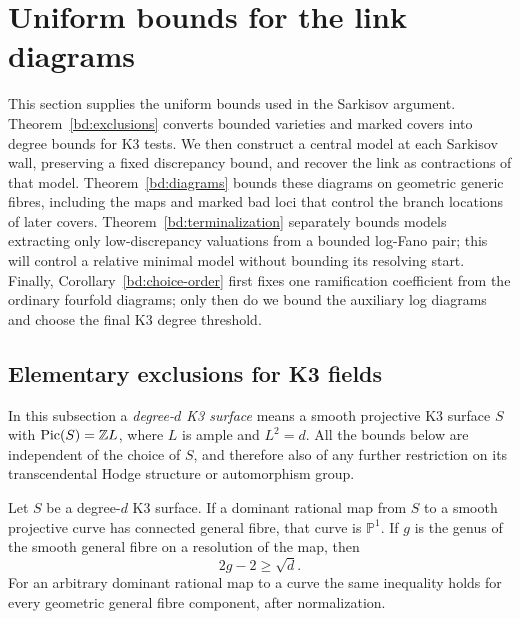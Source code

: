 \section{Uniform bounds for the link diagrams}\label{bd:section}

This section supplies the uniform bounds used in the Sarkisov argument.
Theorem~\ref{bd:exclusions} converts bounded varieties and marked covers
into degree bounds for K3 tests. We then construct a central model at
each Sarkisov wall, preserving a fixed discrepancy bound, and recover
the link as contractions of that model. Theorem~\ref{bd:diagrams}
bounds these diagrams on geometric generic fibres, including the maps
and marked bad loci that control the branch locations of later covers.
Theorem~\ref{bd:terminalization} separately bounds models extracting
only low-discrepancy valuations from a bounded log-Fano pair; this will
control a relative minimal model without bounding its resolving start.
Finally, Corollary~\ref{bd:choice-order} first fixes
one ramification coefficient from the ordinary fourfold diagrams;
only then do we bound the auxiliary log diagrams and choose the final
K3 degree threshold.

\subsection{Elementary exclusions for K3 fields}

In this subsection a \emph{degree-$d$ K3 surface} means a smooth projective
K3 surface $S$ with $\operatorname{Pic}(S)=\mathbb Z L$, where $L$ is ample and
$L^2=d$.  All the bounds below are independent of the choice of $S$, and
therefore also of any further restriction on its transcendental Hodge
structure or automorphism group.

\begin{lemma}\label{bd:pencil}
Let $S$ be a degree-$d$ K3 surface.  If a dominant rational map from $S$
to a smooth projective curve has connected general fibre, that curve is
$\mathbb P^1$.  If $g$ is the genus of the smooth general fibre on a
resolution of the map, then
\[
                         2g-2\geq\sqrt d.
\]
For an arbitrary dominant rational map to a curve the same inequality
holds for every geometric general fibre component, after normalization.
\end{lemma}

